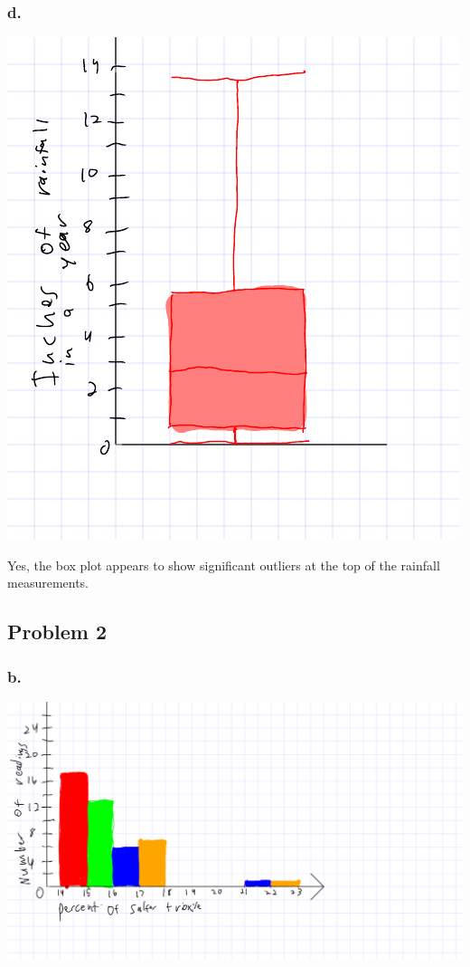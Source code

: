 \documentclass[11pt]{article}
\begin{document}
\subsubsection*{d.}
\includegraphics{homework2_section13_problem1d_boxandwhisker}

Yes, the box plot appears to show significant outliers at the top of the
rainfall measurements. 

\subsection*{Problem 2}
\subsubsection*{b.}
\includegraphics{homework2_section13_problem2b_histogram}
\end{document}
